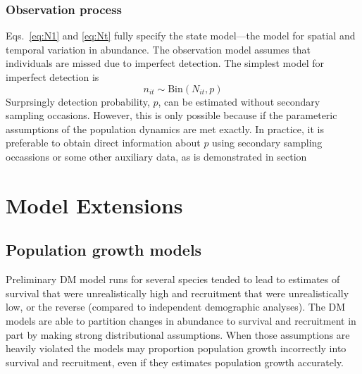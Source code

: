 \documentclass[12pt]{article}
\begin{document}
\subsubsection{Observation process}

Eqs.~\ref{eq:N1} and \ref{eq:Nt} fully specify the state model---the
model for spatial and temporal variation in abundance. The observation
model assumes that individuals are missed due to imperfect
detection. The simplest model for imperfect detection is
\begin{equation}
  n_{it} \sim \mathrm{Bin}(N_{it}, p)
  \label{eq:p1}
\end{equation}
Surprsingly detection probability, $p$, can be estimated without
secondary sampling occasions. However, this is only possible because
if the parameteric assumptions of the population dynamics are met
exactly. In practice, it is preferable to obtain direct information
about $p$ using secondary sampling occassions or some other auxiliary
data, as is demonstrated in section

\section{Model Extensions}
\label{sec:ext}

\subsection{Population growth models}

Preliminary DM model runs for several species tended to lead to
estimates of survival that were unrealistically high and recruitment
that were unrealistically low, or the reverse (compared to independent
demographic analyses).  The DM models are able to partition changes in
abundance to survival and recruitment in part by making strong
distributional assumptions. %
When those assumptions are heavily violated the models may proportion
population growth incorrectly into survival and recruitment, even if
they estimates population growth accurately.
\end{document}

